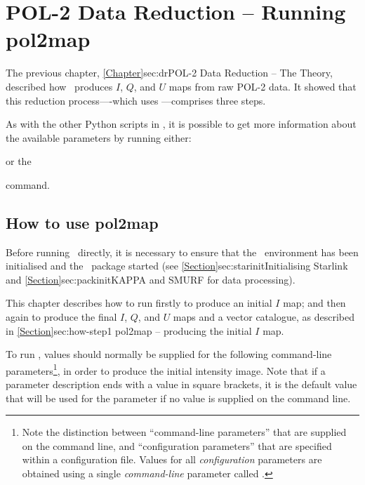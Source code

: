 \chapter{POL-2 Data Reduction -- Running
  pol2map}
\label{sec:rundr}

The previous chapter, \cref{Chapter}{sec:dr}{POL-2 Data Reduction --
  The Theory}, described how \poltwomap\ produces $I$, $Q$, and $U$ maps from raw
POL-2 data.  It showed that this reduction process----which uses
---comprises three steps.

As with the other Python scripts in \SMURF, it is possible to get more
information about the available parameters by running either:
\begin{terminalv}
\end{terminalv}
or the
\begin{terminalv}
\end{terminalv}
command.

\section{How to use pol2map}

Before running \poltwomap\ directly, it is necessary to ensure that
the \starlink\ environment has been initialised and the \smurf\
package started (see \cref{Section}{sec:starinit}{Initialising
  Starlink} and \cref{Section}{sec:packinit}{KAPPA and SMURF for data
  processing}).

This chapter describes how to run  firstly to produce an
initial $I$ map; and then again to produce the final $I$, $Q$, and $U$ maps
and a vector catalogue, as described in \cref{Section}{sec:how-step1}{
pol2map -- producing the initial $I$ map}.

To run , values should normally be supplied for the following
command-line parameters\footnote{Note the distinction between
  ``command-line parameters'' that are supplied on the
   command line, and ``configuration parameters'' that
  are specified within a configuration file. Values for all
  \emph{configuration} parameters are obtained using a single
  \emph{command-line} parameter called .}, in order to
  produce the initial intensity image. Note that if a parameter description ends
  with a value in square brackets, it is the default value that will be used for
the parameter if no value is supplied on the command line.

